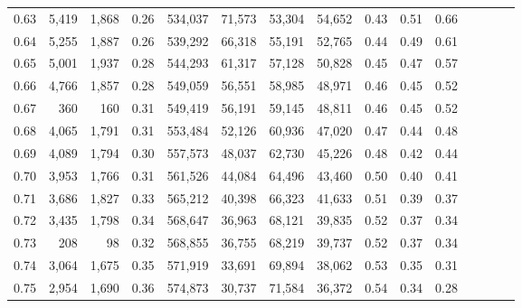 \begin{tabular}{rrrcrrrrrrrrrrr}
0.63 &   5,419 &  1,868 &                                       0.26 &  534,037 &   71,573 &   53,304 &   54,652 &  0.43 &  0.51 &                         0.66 \\
0.64 &   5,255 &  1,887 &                                       0.26 &  539,292 &   66,318 &   55,191 &   52,765 &  0.44 &  0.49 &                         0.61 \\
0.65 &   5,001 &  1,937 &                                       0.28 &  544,293 &   61,317 &   57,128 &   50,828 &  0.45 &  0.47 &                         0.57 \\
0.66 &   4,766 &  1,857 &                                       0.28 &  549,059 &   56,551 &   58,985 &   48,971 &  0.46 &  0.45 &                         0.52 \\
0.67 &     360 &    160 &                                       0.31 &  549,419 &   56,191 &   59,145 &   48,811 &  0.46 &  0.45 &                         0.52 \\
0.68 &   4,065 &  1,791 &                                       0.31 &  553,484 &   52,126 &   60,936 &   47,020 &  0.47 &  0.44 &                         0.48 \\
0.69 &   4,089 &  1,794 &                                       0.30 &  557,573 &   48,037 &   62,730 &   45,226 &  0.48 &  0.42 &                         0.44 \\
0.70 &   3,953 &  1,766 &                                       0.31 &  561,526 &   44,084 &   64,496 &   43,460 &  0.50 &  0.40 &                         0.41 \\
0.71 &   3,686 &  1,827 &                                       0.33 &  565,212 &   40,398 &   66,323 &   41,633 &  0.51 &  0.39 &                         0.37 \\
0.72 &   3,435 &  1,798 &                                       0.34 &  568,647 &   36,963 &   68,121 &   39,835 &  0.52 &  0.37 &                         0.34 \\
0.73 &     208 &     98 &                                       0.32 &  568,855 &   36,755 &   68,219 &   39,737 &  0.52 &  0.37 &                         0.34 \\
0.74 &   3,064 &  1,675 &                                       0.35 &  571,919 &   33,691 &   69,894 &   38,062 &  0.53 &  0.35 &                         0.31 \\
0.75 &   2,954 &  1,690 &                                       0.36 &  574,873 &   30,737 &   71,584 &   36,372 &  0.54 &  0.34 &                         0.28 \\

\end{tabular}
